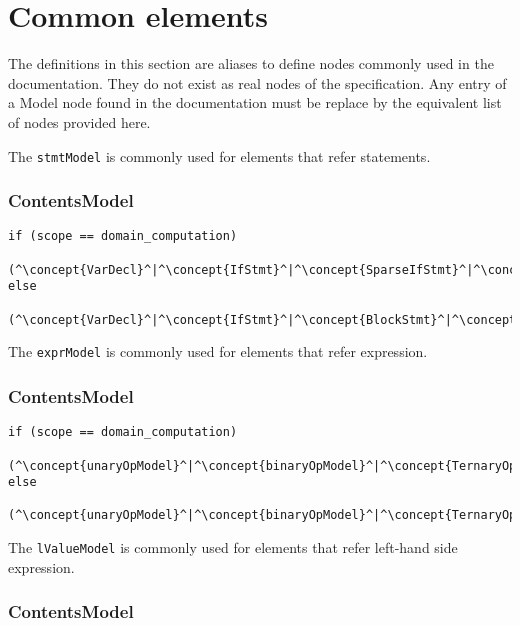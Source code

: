 \section{Common elements}
The definitions in this section are aliases to define nodes 
commonly used in the documentation. 
They do not exist as real nodes of the specification. 
Any entry of a Model node found in the documentation must be replace by the 
equivalent list of nodes provided here. 

The {\tt stmtModel} is commonly used for elements that refer statements.

\subsubsection*{ContentsModel}{}

\begin{lstlisting}[style=default,frame=none]
if (scope == domain_computation)    
  (^\concept{VarDecl}^|^\concept{IfStmt}^|^\concept{SparseIfStmt}^|^\concept{BlockStmt}^|^\concept{LoopOn}^)
else
  (^\concept{VarDecl}^|^\concept{IfStmt}^|^\concept{BlockStmt}^|^\concept{VerticalRegion}^)
\end{lstlisting}


The {\tt exprModel} is commonly used for elements that refer expression.

\subsubsection*{ContentsModel}{}

\begin{lstlisting}[style=default,frame=none]
if (scope == domain_computation)    
    (^\concept{unaryOpModel}^|^\concept{binaryOpModel}^|^\concept{TernaryOp}^|^\concept{Literal}^|^\concept{FieldAccess}^|^\concept{VarAccess}^|^\concept{FctCall}^|^\irrconcept{NeighbourReduce}^)
else
    (^\concept{unaryOpModel}^|^\concept{binaryOpModel}^|^\concept{TernaryOp}^|^\concept{VarAccess}^|^\concept{Literal}^|^\concept{FctCall}^)
\end{lstlisting}


The {\tt lValueModel} is commonly used for elements that refer left-hand side
expression.

\subsubsection*{ContentsModel}{}

